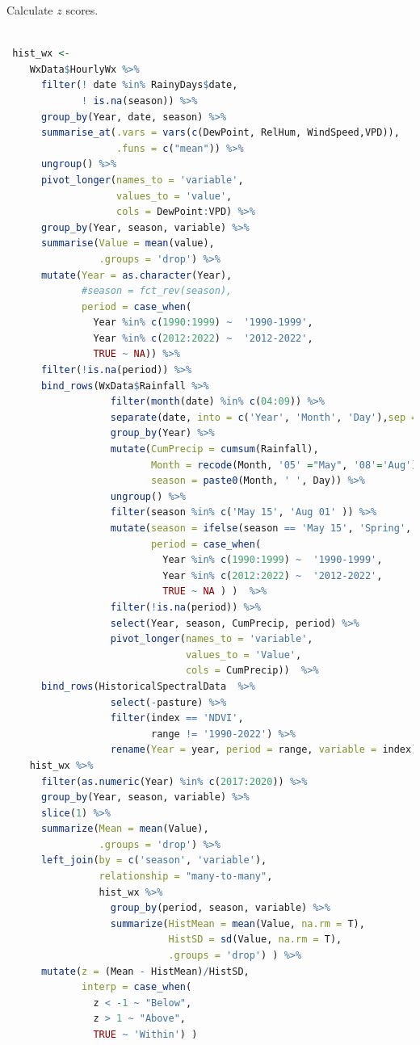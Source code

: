 \documentclass[
]{article}
\begin{document}
Calculate \(z\) scores.

\begin{lstlisting}[language=R]

 hist_wx <-
    WxData$HourlyWx %>%
      filter(! date %in% RainyDays$date, 
             ! is.na(season)) %>%
      group_by(Year, date, season) %>%
      summarise_at(.vars = vars(c(DewPoint, RelHum, WindSpeed,VPD)),
                   .funs = c("mean")) %>%
      ungroup() %>%
      pivot_longer(names_to = 'variable', 
                   values_to = 'value', 
                   cols = DewPoint:VPD) %>%
      group_by(Year, season, variable) %>%
      summarise(Value = mean(value), 
                .groups = 'drop') %>%
      mutate(Year = as.character(Year), 
             #season = fct_rev(season), 
             period = case_when(
               Year %in% c(1990:1999) ~  '1990-1999', 
               Year %in% c(2012:2022) ~  '2012-2022', 
               TRUE ~ NA)) %>%
      filter(!is.na(period)) %>%
      bind_rows(WxData$Rainfall %>% 
                  filter(month(date) %in% c(04:09)) %>%
                  separate(date, into = c('Year', 'Month', 'Day'),sep = '-') %>%
                  group_by(Year) %>%
                  mutate(CumPrecip = cumsum(Rainfall), 
                         Month = recode(Month, '05' ="May", '08'='Aug'), 
                         season = paste0(Month, ' ', Day)) %>%
                  ungroup() %>%
                  filter(season %in% c('May 15', 'Aug 01' )) %>%
                  mutate(season = ifelse(season == 'May 15', 'Spring', 'Summer'), 
                         period = case_when(
                           Year %in% c(1990:1999) ~  '1990-1999', 
                           Year %in% c(2012:2022) ~  '2012-2022', 
                           TRUE ~ NA ) )  %>%
                  filter(!is.na(period)) %>%
                  select(Year, season, CumPrecip, period) %>%
                  pivot_longer(names_to = 'variable', 
                               values_to = 'Value', 
                               cols = CumPrecip))  %>%
      bind_rows(HistoricalSpectralData  %>% 
                  select(-pasture) %>%
                  filter(index == 'NDVI', 
                         range != '1990-2022') %>%
                  rename(Year = year, period = range, variable = index) ) 
    hist_wx %>%
      filter(as.numeric(Year) %in% c(2017:2020)) %>%
      group_by(Year, season, variable) %>%
      slice(1) %>%
      summarize(Mean = mean(Value), 
                .groups = 'drop') %>%
      left_join(by = c('season', 'variable'), 
                relationship = "many-to-many",
                hist_wx %>%
                  group_by(period, season, variable) %>%
                  summarize(HistMean = mean(Value, na.rm = T),
                            HistSD = sd(Value, na.rm = T),
                            .groups = 'drop') ) %>%
      mutate(z = (Mean - HistMean)/HistSD, 
             interp = case_when(
               z < -1 ~ "Below", 
               z > 1 ~ "Above", 
               TRUE ~ 'Within') )

\end{lstlisting}
\end{document}
